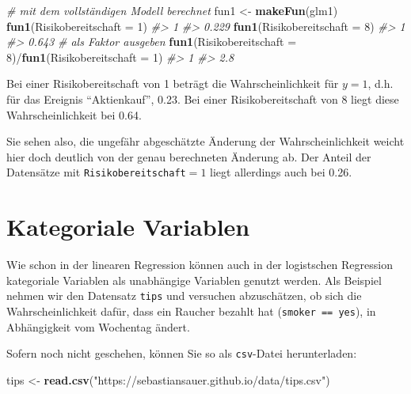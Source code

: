 \documentclass[12pt,]{book}
\newenvironment{Shaded}{\begin{snugshade}}{\end{snugshade}}
\newcommand{\KeywordTok}[1]{\textcolor[rgb]{0.13,0.29,0.53}{\textbf{{#1}}}}
\newcommand{\DataTypeTok}[1]{\textcolor[rgb]{0.13,0.29,0.53}{{#1}}}
\newcommand{\DecValTok}[1]{\textcolor[rgb]{0.00,0.00,0.81}{{#1}}}
\newcommand{\StringTok}[1]{\textcolor[rgb]{0.31,0.60,0.02}{{#1}}}
\newcommand{\CommentTok}[1]{\textcolor[rgb]{0.56,0.35,0.01}{\textit{{#1}}}}
\newcommand{\NormalTok}[1]{{#1}}
\begin{document}
\begin{Shaded}
\begin{Highlighting}[]

\CommentTok{# mit dem vollständigen Modell berechnet}
\NormalTok{fun1 <-}\StringTok{ }\KeywordTok{makeFun}\NormalTok{(glm1)}
\KeywordTok{fun1}\NormalTok{(}\DataTypeTok{Risikobereitschaft =} \DecValTok{1}\NormalTok{)}
\CommentTok{#>     1 }
\CommentTok{#> 0.229}
\KeywordTok{fun1}\NormalTok{(}\DataTypeTok{Risikobereitschaft =} \DecValTok{8}\NormalTok{)}
\CommentTok{#>     1 }
\CommentTok{#> 0.643}
\CommentTok{# als Faktor ausgeben}
\KeywordTok{fun1}\NormalTok{(}\DataTypeTok{Risikobereitschaft =} \DecValTok{8}\NormalTok{)/}\KeywordTok{fun1}\NormalTok{(}\DataTypeTok{Risikobereitschaft =} \DecValTok{1}\NormalTok{)}
\CommentTok{#>   1 }
\CommentTok{#> 2.8}
\end{Highlighting}
\end{Shaded}

Bei einer Risikobereitschaft von 1 beträgt die Wahrscheinlichkeit für
\(y=1\), d.h. für das Ereignis ``Aktienkauf'', 0.23. Bei einer
Risikobereitschaft von 8 liegt diese Wahrscheinlichkeit bei 0.64.

Sie sehen also, die ungefähr abgeschätzte Änderung der
Wahrscheinlichkeit weicht hier doch deutlich von der genau berechneten
Änderung ab. Der Anteil der Datensätze mit
\texttt{Risikobereitschaft}\(=1\) liegt allerdings auch bei 0.26.

\section{Kategoriale Variablen}\label{kategoriale-variablen}

Wie schon in der linearen Regression können auch in der logistschen
Regression kategoriale Variablen als unabhängige Variablen genutzt
werden. Als Beispiel nehmen wir den Datensatz \texttt{tips} und
versuchen abzuschätzen, ob sich die Wahrscheinlichkeit dafür, dass ein
Raucher bezahlt hat (\texttt{smoker\ ==\ yes}), in Abhängigkeit vom
Wochentag ändert.

Sofern noch nicht geschehen, können Sie so als \texttt{csv}-Datei
herunterladen:

\begin{Shaded}
\begin{Highlighting}[]
\NormalTok{tips <-}\StringTok{ }\KeywordTok{read.csv}\NormalTok{(}\StringTok{"https://sebastiansauer.github.io/data/tips.csv"}\NormalTok{)}
\end{Highlighting}
\end{Shaded}
\end{document}
